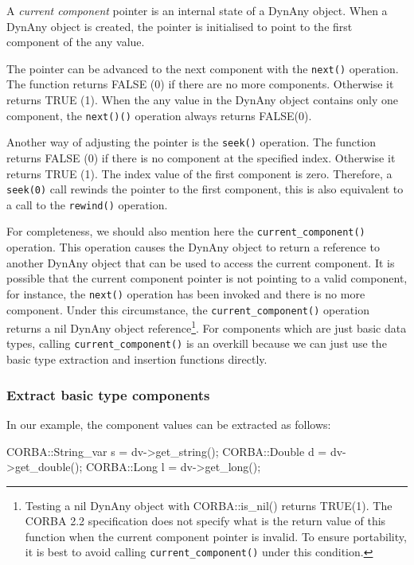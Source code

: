 \documentclass[11pt,twoside,a4paper]{book}
\newcommand{\code}[1]{\texttt{#1}}
\newcommand{\op}[1]{\texttt{#1()}}
\newcommand{\term}[1]{\textit{#1}}
\begin{document}
A \term{current component} pointer is an internal state of a DynAny
object. When a DynAny object is created, the pointer is initialised
to point to the first component of the any value.

The pointer can be advanced to the next component with the \op{next}
operation. The function returns FALSE (0) if there are no more
components.  Otherwise it returns TRUE (1). When the any value in the
DynAny object contains only one component, the \op{next()} operation
always returns FALSE(0).

Another way of adjusting the pointer is the \op{seek} operation. The
function returns FALSE (0) if there is no component at the specified
index. Otherwise it returns TRUE (1). The index value of the first
component is zero. Therefore, a \code{seek(0)} call rewinds the
pointer to the first component, this is also equivalent to a call to
the \op{rewind} operation.

For completeness, we should also mention here the
\op{current\_component} operation. This operation causes the DynAny
object to return a reference to another DynAny object that can be used
to access the current component. It is possible that the current
component pointer is not pointing to a valid component, for instance,
the \op{next} operation has been invoked and there is no more
component. Under this circumstance, the \op{current\_component}
operation returns a nil DynAny object reference\footnote{Testing a nil
DynAny object with CORBA::is\_nil() returns TRUE(1). The CORBA 2.2
specification does not specify what is the return value of this
function when the current component pointer is invalid. To ensure
portability, it is best to avoid calling \op{current\_component} under
this condition.}. For components which are just basic data types,
calling \op{current\_component} is an overkill because we can just use
the basic type extraction and insertion functions directly.

\subsubsection{Extract basic type components}

In our example, the component values can be extracted as follows:

\begin{cxxlisting}
CORBA::String_var s = dv->get_string();
CORBA::Double     d = dv->get_double();
CORBA::Long       l = dv->get_long();
\end{cxxlisting}
\end{document}

